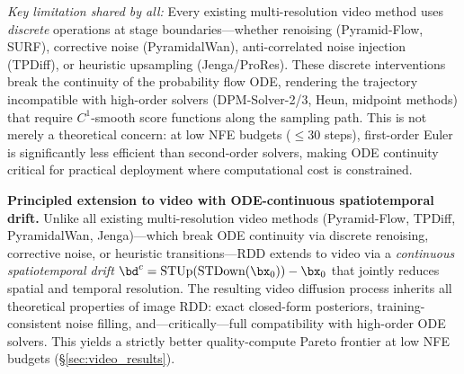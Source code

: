 \emph{Key limitation shared by all:} Every existing multi-resolution video method uses \emph{discrete} operations at stage boundaries---whether renoising (Pyramid-Flow, SURF), corrective noise (PyramidalWan), anti-correlated noise injection (TPDiff), or heuristic upsampling (Jenga/ProRes).
These discrete interventions break the continuity of the probability flow ODE, rendering the trajectory incompatible with high-order solvers (DPM-Solver-2/3, Heun, midpoint methods) that require $C^1$-smooth score functions along the sampling path.
This is not merely a theoretical concern: at low NFE budgets ($\leq 30$ steps), first-order Euler is significantly less efficient than second-order solvers, making ODE continuity critical for practical deployment where computational cost is constrained.



\item \textbf{Principled extension to video with ODE-continuous spatiotemporal drift.}
    Unlike all existing multi-resolution video methods (Pyramid-Flow, TPDiff, PyramidalWan, Jenga)---which break ODE continuity via discrete renoising, corrective noise, or heuristic transitions---RDD extends to video via a \emph{continuous spatiotemporal drift} $\bd^c = \text{STUp}(\text{STDown}(\bx_0)) - \bx_0$ that jointly reduces spatial and temporal resolution.
    The resulting video diffusion process inherits all theoretical properties of image RDD: exact closed-form posteriors, training-consistent noise filling, and---critically---full compatibility with high-order ODE solvers.
    This yields a strictly better quality-compute Pareto frontier at low NFE budgets (\S\ref{sec:video_results}).



